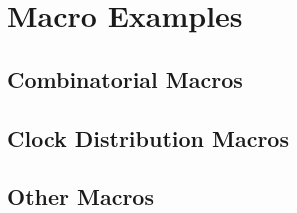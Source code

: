 \part{Macro Examples}
\pagestyle{headings}


\chapter{Combinatorial Macros}




\chapter{Clock Distribution Macros}




\chapter{Other Macros}


